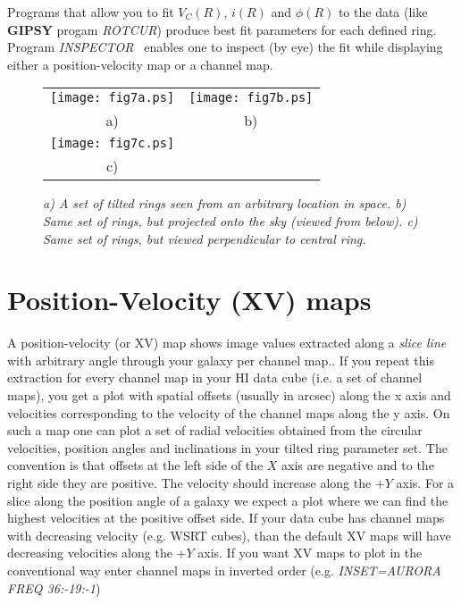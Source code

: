 \documentclass[11pt,a4paper]{article}
\begin{document}
Programs that allow you to fit  $V_{C}(R)$, $i(R)$ and $\phi(R)$ 
to the data (like {\bf GIPSY} progam {\it ROTCUR}) produce best fit parameters
for each defined ring. Program {\it INSPECTOR\ } 
enables one to inspect (by eye) the fit while displaying either
a position-velocity map or a channel map. 
 
\begin{figure}[h]
\centering
\begin{tabular}{cc}

\begin{minipage}{6cm}
\centering
\texttt{[image: fig7a.ps]}
\end{minipage}
&
\begin{minipage}{6cm}
\centering
\texttt{[image: fig7b.ps]}   
\end{minipage}
\\ a) & b)
\\
\begin{minipage}{6cm}
\centering
\texttt{[image: fig7c.ps]}
\end{minipage}
\\ c)
\end{tabular}
\caption{\it a) A set of tilted rings seen from an arbitrary location in space.
b) Same set of rings, but projected onto the sky (viewed from below).
c) Same set of rings, but viewed perpendicular to central ring.}
\label{fig:fig7abc}
\end{figure}
\pagebreak


\section{Position-Velocity (XV) maps}
A position-velocity (or XV) map shows image values extracted along a {\it slice line}
with arbitrary angle through your galaxy per channel map.. 
If you repeat this extraction for every channel map in your 
HI data cube (i.e. a set of channel maps), 
you get a plot with spatial offsets (usually in arcsec) along the x axis
and velocities corresponding to the velocity of the channel maps along
the y axis. 
On such a map one can plot a set of radial velocities
obtained from the circular velocities, position angles and inclinations in your
tilted ring parameter set. 
The convention is that offsets at the left side of the $X$ axis are negative and
to the right side they are positive. The velocity should increase along the +$Y$ axis.
For a slice along the position angle of a galaxy we expect a plot where we can
find the highest velocities at the positive offset side.
If your data cube has channel maps with decreasing velocity (e.g. WSRT cubes),
than the default XV maps will have decreasing velocities along the +$Y$ axis. If you want 
XV maps to plot in the conventional way enter channel maps in inverted order
(e.g. {\it INSET=AURORA FREQ 36:-19:-1})
\end{document}

